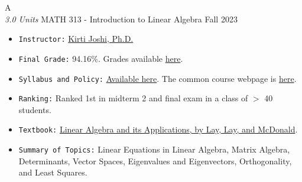 \cventry
{A \\ \small{\textit{3.0 Units}}}
{MATH 313 - Introduction to Linear Algebra}
{Fall 2023}
{}
{}
{
  \begin{itemize}
    \item \texttt{Instructor:} \href{https://www.math.arizona.edu/~kirti/}{Kirti Joshi, Ph.D.}
    \item \texttt{Final Grade:} 94.16\%. Grades available \href{https://mhrezaei.com/assets/cv/courses/Fall2023/MATH313/Grades.pdf}{here}.
    \item \texttt{Syllabus and Policy:} \href{https://mhrezaei.com/assets/cv/courses/Fall2023/MATH313/Syllabus.pdf}{Available here}. The common course webpage is \href{https://math313.math.arizona.edu/}{here}.
    \item \texttt{Ranking:} Ranked 1st in midterm 2 and final exam in a class of $>$ 40 students.
    \item \texttt{Textbook:} \href{}{Linear Algebra and its Applications, by Lay, Lay, and McDonald}.
    \item \texttt{Summary of Topics:} Linear Equations in Linear Algebra, Matrix Algebra, Determinants, Vector Spaces, Eigenvalues and Eigenvectors, Orthogonality, and Least Squares.
  \end{itemize}
}

